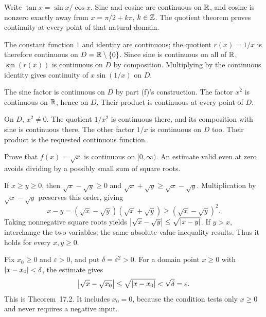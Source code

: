 Write $\tan x=\sin x/\cos x$. Sine and cosine are continuous
on $\mathbb{R}$, and cosine is nonzero exactly away from
$x=\pi/2+k\pi$, $k\in\mathbb{Z}$. The quotient theorem proves
continuity at every point of that natural domain.

The constant function $1$ and identity are continuous; the
quotient $r(x)=1/x$ is therefore continuous on
$D=\mathbb{R}\setminus\{0\}$. Since sine is continuous on all of
$\mathbb{R}$, $\sin(r(x))$ is continuous on $D$ by composition.
Multiplying by the continuous identity gives continuity of
$x\sin(1/x)$ on $D$.

The sine factor is continuous on $D$ by part (f)'s construction.
The factor $x^2$ is continuous on $\mathbb{R}$, hence on $D$.
Their product is continuous at every point of $D$.

On $D$, $x^2\ne0$. The quotient $1/x^2$ is continuous there,
and its composition with sine is continuous there.
The other factor $1/x$ is continuous on $D$ too. Their product
is the requested continuous function.

\goal Prove that $f(x)=\sqrt x$ is continuous on $[0,\infty)$.
\idea An estimate valid even at zero avoids dividing by a
possibly small sum of square roots.

If $x\ge y\ge0$, then $\sqrt x-\sqrt y\ge0$ and
$\sqrt x+\sqrt y\ge\sqrt x-\sqrt y$. Multiplication by
$\sqrt x-\sqrt y$ preserves this order, giving
\[
 x-y=(\sqrt x-\sqrt y)(\sqrt x+\sqrt y)
 \ge(\sqrt x-\sqrt y)^2.
\]
Taking nonnegative square roots yields
$\left|\sqrt x-\sqrt y\right|\le\sqrt{\left|x-y\right|}$.
If $y>x$, interchange the two variables; the same absolute-value
inequality results. Thus it holds for every $x,y\ge0$.

Fix $x_0\ge0$ and $\varepsilon>0$, and put
$\delta=\varepsilon^2>0$. For a domain point $x\ge0$ with
$\left|x-x_0\right|<\delta$, the estimate gives
\[
 \left|\sqrt x-\sqrt{x_0}\right|
 \le\sqrt{\left|x-x_0\right|}<\sqrt\delta=\varepsilon.
\]
This is Theorem~17.2. It includes $x_0=0$, because the condition
tests only $x\ge0$ and never requires a negative input.


